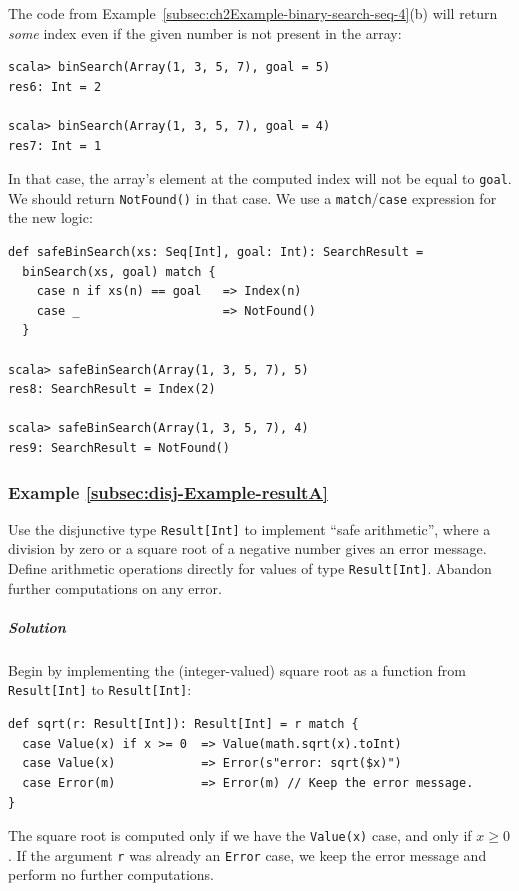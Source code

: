The code from Example~\ref{subsec:ch2Example-binary-search-seq-4}(b)
will return \emph{some} index even if the given number is not present
in the array: 
\begin{lstlisting}
scala> binSearch(Array(1, 3, 5, 7), goal = 5)
res6: Int = 2

scala> binSearch(Array(1, 3, 5, 7), goal = 4)
res7: Int = 1
\end{lstlisting}
In that case, the array\textsf{'}s element at the computed index will not be
equal to \lstinline!goal!. We should return \lstinline!NotFound()!
in that case. We use a \lstinline!match!/\lstinline!case! expression
for the new logic:
\begin{lstlisting}
def safeBinSearch(xs: Seq[Int], goal: Int): SearchResult =
  binSearch(xs, goal) match {
    case n if xs(n) == goal   => Index(n) 
    case _                    => NotFound()
  }

scala> safeBinSearch(Array(1, 3, 5, 7), 5)
res8: SearchResult = Index(2)

scala> safeBinSearch(Array(1, 3, 5, 7), 4)
res9: SearchResult = NotFound()
\end{lstlisting}


\subsubsection{Example \label{subsec:disj-Example-resultA}\ref{subsec:disj-Example-resultA}}

Use the disjunctive type \lstinline!Result[Int]! to implement \textsf{``}safe
arithmetic\textsf{''}, where a division by zero or a square root of a negative
number gives an error message. Define arithmetic operations directly
for values of type \lstinline!Result[Int]!. Abandon further computations
on any error.

\subparagraph{Solution}

Begin by implementing the (integer-valued) square root as a function
from \lstinline!Result[Int]! to \lstinline!Result[Int]!:
\begin{lstlisting}
def sqrt(r: Result[Int]): Result[Int] = r match {
  case Value(x) if x >= 0  => Value(math.sqrt(x).toInt)
  case Value(x)            => Error(s"error: sqrt($x)")
  case Error(m)            => Error(m) // Keep the error message.
}
\end{lstlisting}
The square root is computed only if we have the \lstinline!Value(x)!
case, and only if $x\geq0$. If the argument \lstinline!r! was already
an \lstinline!Error! case, we keep the error message and perform
no further computations.

